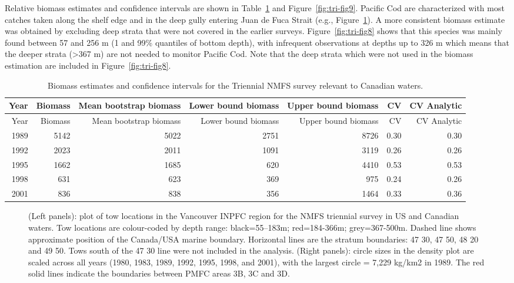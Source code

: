 \documentclass[11pt]{book}
\begin{document}
Relative biomass estimates and confidence intervals are shown in Table~\ref{tab:surv-trien-table} and Figure~\ref{fig:tri-fig9}. Pacific Cod are characterized with most catches taken along the shelf edge and in the deep gully entering Juan de Fuca Strait (e.g., Figure~\ref{fig:tri-tows}). A more consistent biomass estimate was obtained by excluding deep strata that were not covered in the earlier surveys. Figure~\ref{fig:tri-fig8} shows that this species was mainly found between 57 and 256 m (1 and 99\% quantiles of bottom depth), with infrequent observations at depths up to 326 m which means that the deeper strata (\textgreater367 m) are not needed to monitor Pacific Cod. Note that the deep strata which were not used in the biomass estimation are included in Figure~\ref{fig:tri-fig8}.
\begin{longtable}[]{@{}rrrrrrr@{}}
\caption{\label{tab:surv-trien-table}Biomass estimates and confidence intervals for the Triennial NMFS survey relevant to Canadian waters.}\tabularnewline
\toprule
Year & Biomass & Mean bootstrap biomass & Lower bound biomass & Upper bound biomass & CV & CV Analytic\tabularnewline
\midrule
\endfirsthead
\toprule
Year & Biomass & Mean bootstrap biomass & Lower bound biomass & Upper bound biomass & CV & CV Analytic\tabularnewline
\midrule
\endhead
1989 & 5142 & 5022 & 2751 & 8726 & 0.30 & 0.30\tabularnewline
1992 & 2023 & 2011 & 1091 & 3119 & 0.26 & 0.26\tabularnewline
1995 & 1662 & 1685 & 620 & 4410 & 0.53 & 0.53\tabularnewline
1998 & 631 & 623 & 369 & 975 & 0.24 & 0.26\tabularnewline
2001 & 836 & 838 & 356 & 1464 & 0.33 & 0.36\tabularnewline
\bottomrule
\end{longtable}
\begin{figure}[htb]

{\centering {} 

}

\caption{(Left panels): plot of tow locations in the Vancouver INPFC region for the NMFS triennial survey in US and Canadian waters. Tow locations are colour-coded by depth range: black=55--183m; red=184-366m; grey=367-500m. Dashed line shows approximate position of the Canada/USA marine boundary. Horizontal lines are the stratum boundaries: 47 30, 47 50, 48 20 and 49 50. Tows south of the 47 30 line were not included in the analysis. (Right panels): circle sizes in the density plot are scaled across all years (1980, 1983, 1989, 1992, 1995, 1998, and 2001), with the largest circle = 7,229 kg/km2 in 1989. The red solid lines indicate the boundaries between PMFC areas 3B, 3C and 3D.}\label{fig:tri-tows}
\end{figure}
\end{document}
